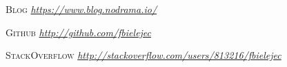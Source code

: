 \documentclass[a4paper, oneside, final]{scrartcl}
\newenvironment{lyxlist}[1]
{\begin{list}{}
{\settowidth{\labelwidth}{#1}
 \setlength{\leftmargin}{\labelwidth}
 \addtolength{\leftmargin}{\labelsep}
 \renewcommand{\makelabel}[1]{##1\hfil}}}
{\end{list}}
\newcommand{\noun}[1]{\textsc{#1}}
\begin{document}
\begin{center}
 \begin{lyxlist}{00.00.0000}

 \item [{\noun{\scriptsize Blog}}] \emph{ \url{https://www.blog.nodrama.io/} }

 \item [{\noun{\scriptsize Github}}] \emph{ \url{http://github.com/fbielejec} }

 \item [{\noun{\scriptsize StackOverflow}}] \emph{ \url{http://stackoverflow.com/users/813216/fbielejec }}

\end{lyxlist}

\end{center}
\end{document}
